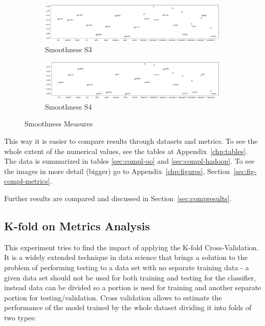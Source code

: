 \begin{figure}[h!]\ContinuedFloat
    \centering
    \begin{subfigure}{0.496\textwidth}
        \includegraphics[width=0.99\textwidth]{figures/smoothness-S3.png}
        \caption{Smoothness S3}
        \label{fig:smoothness-s3}
    \end{subfigure}
    \begin{subfigure}{0.496\textwidth}
        \includegraphics[width=0.99\textwidth]{figures/smoothness-S4.png}
        \caption{Smoothness S4}
        \label{fig:smoothness-s4}
    \end{subfigure}
    \caption{Smoothness Measures}
    \label{fig:smoothness}
\end{figure}

This way it is easier to compare results through datasets and metrics. To see 
the whole extent of the numerical values, see the tables at 
Appendix~\ref{chp:tables}. The data is summarized in tables \ref{sec:compl-oo} 
and \ref{sec:compl-hadoop}. To see the images in more detail (bigger) go to 
Appendix~\ref{chp:figures}, Section~\ref{sec:fig-compl-metrics}.

Further results are compared and discussed in Section~\ref{sec:compresults}.

\newpage

\subsection{K-fold on Metrics Analysis}\label{sec:exp-kfold}

This experiment tries to find the impact of applying the K-fold 
Cross-Validation. It is a widely extended technique in data science that brings 
a solution to the problem of performing testing to a data set with no separate
training data - a given data set should not be used for both training and 
testing for the classifier, instead data can be divided so a portion is used
for training and another separate portion for testing/validation. Cross 
validation allows to estimate the performance of the model trained by the whole 
dataset dividing it into folds of two types:

